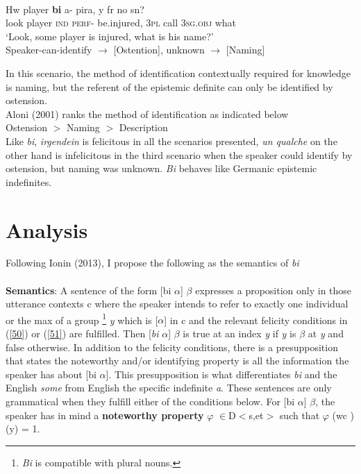 \documentclass[output=paper,
modfonts
]{langsci/langscibook}
\begin{document}
 \ea\label{ex45}\\
\gll Hw player \textbf{bi} a- pira, y fr no sn?\\
look player  \textsc{ind} \textsc{perf}- be.injured, \textsc{3pl} call \textsc{3sg}.\textsc{obj} what\\
\glt `Look, some player is injured, what is his name?'\\
	Speaker-can-identify $\rightarrow$ [Ostention], unknown $\rightarrow$  [Naming]

 \z In this scenario, the method of identification contextually required for knowledge is naming, but the referent of the epistemic definite can only be identified by ostension. \\
 Aloni (2001) ranks the method of identification as indicated below\\
 
 Ostension $>$ Naming $>$ Description\\
 
Like \emph{bi}, \emph{irgendein} is felicitous in all the scenarios presented, \emph{un qualche} on the other hand is infelicitous in the third scenario when the speaker could identify by ostension, but naming was unknown. \emph{Bi} behaves like Germanic epistemic indefinites.

\section{Analysis}
Following Ionin (2013), I propose the following as the semantics of \emph{bi}\\
\\
\textbf{Semantics}: A sentence of the form [bi $\alpha$] $\beta$ expresses a proposition only in those utterance contexts c where the speaker intends to refer to exactly one individual or the max of a group \footnote{\emph{Bi} is compatible with plural nouns.} \emph{y} which is [$\alpha$] in c and the relevant felicity conditions in (\ref{50}) or (\ref{51}) are fulfilled. Then [\emph{bi} $\alpha$] $\beta$ is true at an index \emph{y} if \emph{y} is $\beta$ at \emph{y} and false otherwise. In addition to the felicity conditions, there is a presupposition that states the noteworthy and/or identifying property is all the information the speaker has about [bi $\alpha$]. This presupposition is what differentiates \emph{bi} and the English \emph{some} from English the specific indefinite \emph{a}.   
These sentences are only grammatical when they fulfill either of the conditions below. 
\ea
\ea \label{50} For [bi $\alpha$] $\beta$, the speaker has in mind a \textbf{noteworthy property} $\varphi$ $\in$D$<$s,et$>$ such that $\varphi$ (wc )(y) = 1.
\end{document}
